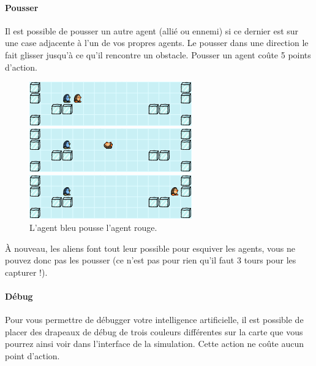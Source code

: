 \newpage
\paragraph{Pousser}\label{pousser}

Il est possible de pousser un autre agent (allié ou ennemi) si ce
dernier est sur une case adjacente à l'un de vos propres agents. Le
pousser dans une direction le fait glisser jusqu'à ce qu'il rencontre un
obstacle. Pousser un agent coûte 5 points d'action.

\begin{figure}[!h]
    \centering
    \includegraphics[width=7cm]{img/push1}

    \vspace{0.5cm}
    \includegraphics[width=7cm]{img/push2}

    \vspace{0.5cm}
    \includegraphics[width=7cm]{img/push3}

    \caption*{L'agent bleu pousse l'agent rouge.}
\end{figure}

À nouveau, les aliens font tout leur possible pour esquiver les agents,
vous ne pouvez donc pas les pousser (ce n'est pas pour rien qu'il faut 3
tours pour les capturer !).

\paragraph{Débug}\label{duxe9bug}

Pour vous permettre de débugger votre intelligence artificielle, il est
possible de placer des drapeaux de débug de trois couleurs différentes
sur la carte que vous pourrez ainsi voir dans l'interface de la
simulation. Cette action ne coûte aucun point d'action.

